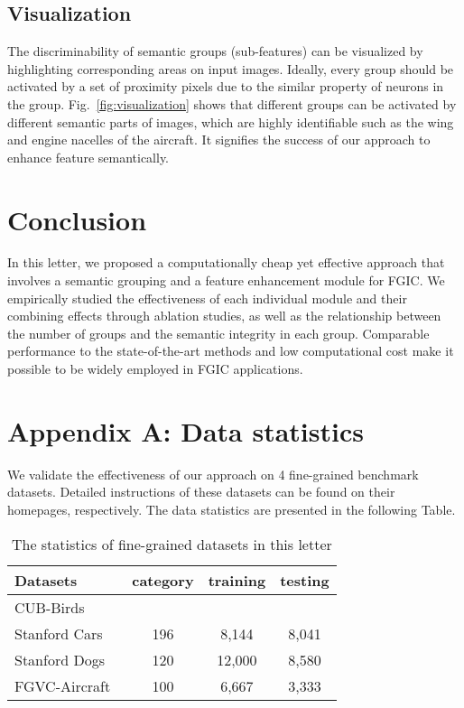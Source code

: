 \documentclass[journal]{IEEEtran}
\begin{document}
\subsection{Visualization}
\label{sec:visualization}
The discriminability of semantic groups (sub-features) can be visualized by highlighting corresponding areas on input images. Ideally, every group should be activated by a set of proximity pixels due to the similar property of neurons in the group. Fig.~\ref{fig:visualization} shows that different groups can be activated by different semantic parts of images, which are highly identifiable such as the wing and engine nacelles of the aircraft. It signifies the success of our approach to enhance feature semantically.



\section{Conclusion}
\label{sec:summary}
In this letter, we proposed a computationally cheap yet effective approach that involves a semantic grouping and a feature enhancement module for FGIC. We empirically studied the effectiveness of each individual module and their combining effects through ablation studies, as well as the relationship between the number of groups and the semantic integrity in each group. Comparable performance to the state-of-the-art methods and low computational cost make it possible to be widely employed in FGIC applications. 




\section*{Appendix A: Data statistics}
We validate the effectiveness of our approach on 4 fine-grained benchmark datasets. Detailed instructions of these datasets can be found on their homepages, respectively. The data statistics are presented in the following Table.
\begin{table}[h]
    \centering
    \caption{The statistics of fine-grained datasets in this letter}
    \begin{threeparttable}
        \begin{tabular}{lccc}
            \toprule
            Datasets & category & training & testing \\
            \midrule
            CUB-Birds~\cite{cubbirds11caltech} &  &  &  \\
            Stanford Cars~\cite{stcars13feifei} & 196 & 8,144 &8,041 \\
            Stanford Dogs~\cite{stdogs11feifei} & 120 & 12,000 &8,580\\
            FGVC-Aircraft~\cite{vggaircraft13Vedaldi} & 100 & 6,667 &3,333\\
            \bottomrule
        \end{tabular}
    \end{threeparttable}
    \label{tab:datasets}
\end{table}
\end{document}
